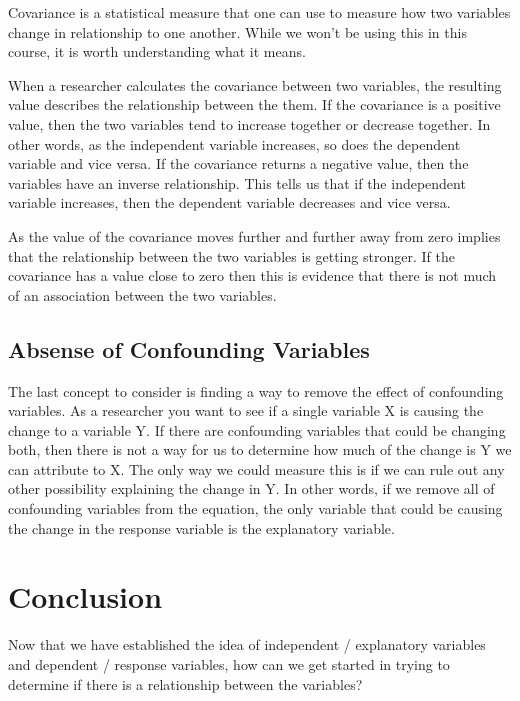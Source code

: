 \documentclass[
  letterpaper,
  DIV=11,
  numbers=noendperiod]{scrreprt}
\begin{document}
Covariance is a statistical measure that one can use to measure how two
variables change in relationship to one another. While we won't be using
this in this course, it is worth understanding what it means.

When a researcher calculates the covariance between two variables, the
resulting value describes the relationship between the them. If the
covariance is a positive value, then the two variables tend to increase
together or decrease together. In other words, as the independent
variable increases, so does the dependent variable and vice versa. If
the covariance returns a negative value, then the variables have an
inverse relationship. This tells us that if the independent variable
increases, then the dependent variable decreases and vice versa.

As the value of the covariance moves further and further away from zero
implies that the relationship between the two variables is getting
stronger. If the covariance has a value close to zero then this is
evidence that there is not much of an association between the two
variables.

\subsection*{Absense of Confounding
Variables}\label{absense-of-confounding-variables}

The last concept to consider is finding a way to remove the effect of
confounding variables. As a researcher you want to see if a single
variable X is causing the change to a variable Y. If there are
confounding variables that could be changing both, then there is not a
way for us to determine how much of the change is Y we can attribute to
X. The only way we could measure this is if we can rule out any other
possibility explaining the change in Y. In other words, if we remove all
of confounding variables from the equation, the only variable that could
be causing the change in the response variable is the explanatory
variable.

\section*{Conclusion}\label{conclusion-3}


Now that we have established the idea of independent / explanatory
variables and dependent / response variables, how can we get started in
trying to determine if there is a relationship between the variables?
\end{document}
